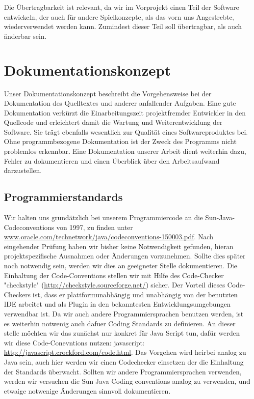 \documentclass[11pt,a4paper]{article}
\begin{document}
Die Übertragbarkeit ist relevant, da wir im Vorprojekt einen Teil der Software entwickeln, der auch für andere Spielkonzepte, als das vorn uns Angestrebte, wiederverwendet werden kann.
Zumindest dieser Teil soll übertragbar, als auch änderbar sein.




\section{Dokumentationskonzept}

Unser Dokumentationskonzept beschreibt die Vorgehensweise bei der Dokumentation des Quelltextes und anderer anfallender Aufgaben. Eine gute Dokumentation verkürzt die Einarbeitungszeit projektfremder Entwickler in den Quellcode und erleichtert damit die Wartung und Weiterentwicklung der Software. Sie trägt ebenfalls wesentlich zur Qualität eines Softwareproduktes bei. Ohne programmbezogene Dokumentation ist der Zweck des Programms nicht problemlos erkennbar. Eine Dokumentation unserer Arbeit dient weiterhin dazu, Fehler zu dokumentieren und einen Überblick über den Arbeitsaufwand darzustellen.

\subsection{Programmierstandards}

Wir halten uns grundätzlich bei unserem Programmiercode an die Sun-Java-Codeconventions von 1997, zu finden unter \url{ www.oracle.com/technetwork/java/codeconventions-150003.pdf}. Nach eingehender Prüfung haben wir bisher keine Notwendigkeit gefunden, hieran projektspezifische Ausnahmen oder Änderungen vorzunehmen. Sollte dies später noch notwendig sein, werden wir dies an geeigneter Stelle dokumentieren. Die Einhaltung der Code-Conventions stellen wir mit Hilfe des Code-Checker "checkstyle" (\url{http://checkstyle.sourceforge.net/}) sicher. Der Vorteil dieses Code-Checkers ist, dass er plattformunabhängig und unabhängig von der benutzten IDE arbeitet und als Plugin in den bekanntesten Entwicklungsumgebungen verwendbar ist.
Da wir auch andere Programmiersprachen benutzen werden, ist es weiterhin notwenig auch dafuer Coding Standards zu definieren. An dieser stelle möchten wir das zunächst nur konkret für Java Script tun, dafür werden wir diese Code-Conevntions nutzen: javascript: \url{http://javascript.crockford.com/code.html}. Das Vorgehen wird heirbei analog zu Java sein, auch hier werden wir einen Codechecker einsetzen der die Einhaltung der Standards überwacht. Sollten wir andere Programmiersprachen verwenden, werden wir versuchen die Sun Java Coding conventions analog zu verwenden, und etwaige notwenige Änderungen sinnvoll dokumentieren.
\end{document}
